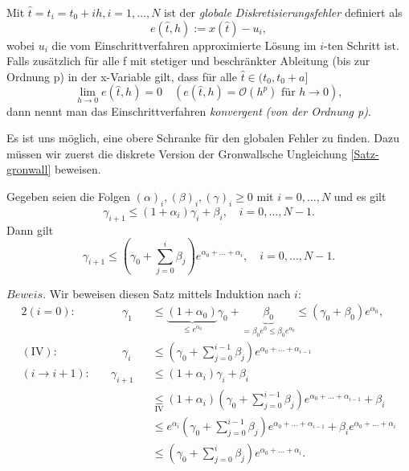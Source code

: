\begin{definition}
    Mit $\hat{t} = t_i = t_0+ih, i=1,\dots, N$ ist der {\em globale Diskretisierungsfehler} definiert als
    \[
        e(\hat{t}, h) := x(\hat{t}) - u_i,
    \]
    wobei $u_i$ die vom Einschrittverfahren approximierte Lösung im $i$-ten Schritt ist.\\
    Falls zusätzlich für alle f mit stetiger und beschränkter Ableitung (bis zur Ordnung p) in der x-Variable gilt, dass
    für alle $\hat{t} \in (t_0, t_0+a]$
    \[
        \lim_{h \rightarrow 0 } e(\hat{t}, h)=0 \quad (e(\hat{t},h) = \mathcal{O}(h^p) \text{ für } h \rightarrow 0),
    \] dann nennt man das Einschrittverfahren {\em konvergent} {\em (von der Ordnung p)}.
\end{definition}
Es ist uns möglich, eine obere Schranke für den globalen Fehler zu finden. Dazu müssen wir zuerst die diskrete Version
der Gronwallsche Ungleichung \ref{Satz-gronwall} beweisen.
\begin{satz}
    Gegeben seien die Folgen $(\alpha)_i,(\beta)_i,(\gamma)_i \geq 0$ mit $i = 0,\dots,N$ und es gilt
    \[
        \gamma_{i+1} \leq (1 + \alpha_i)\gamma_i + \beta_i, \quad i=0,\dots,N-1.
    \] Dann gilt
    \[
        \gamma_{i+1} \leq \left( \gamma_0 + \sum_{j=0}^{i}\beta_j \right) e^{\alpha_0 + \dots + \alpha_i},  \quad
        i=0, \dots, N-1.
    \]
\end{satz}
$Beweis.$ Wir beweisen diesen Satz mittels Induktion nach $i$:
\begin{alignat*}{2}
    (i=0):& \qquad \gamma_1 &&\leq
    \underbrace{(1 + \alpha_0)}_{\leq e^{\alpha_0}}\gamma_0 +
    \underbrace{\beta_0}_{=\beta_0 e^{0} \leq \beta_0 e^{\alpha_0}} \leq (\gamma_0 + \beta_0)e^{\alpha_0},\\
    (\text{IV}):& \qquad
    \gamma_{i} &&\leq \left( \gamma_0 + \sum_{j=0}^{i-1}\beta_j \right) e^{\alpha_0 + \dots + \alpha_{i-1}} \\
    (i \rightarrow i+1):& \quad
    \gamma_{i+1} &&\leq (1 + \alpha_{i})\gamma_{i} + \beta_i\\
    & &&\underset{\text{IV}}{\leq} (1 + \alpha_i)
    \left( \gamma_0 + \sum_{j=0}^{i-1}\beta_j \right) e^{\alpha_0 + \dots + \alpha_{i-1}}+\beta_{i}\\
    &  &&\leq e^{\alpha_i} \left( \gamma_0 + \sum_{j=0}^{i-1}\beta_j \right) e^{\alpha_0 + \dots + \alpha_{i-1}}
    + \beta_i e^{\alpha_0 + \dots + \alpha_{i}}\\
    &  &&\leq \left( \gamma_0 +  \sum_{j=0}^{i}\beta_j \right) e^{\alpha_0 + \dots + \alpha_{i}}.
\end{alignat*}\qedwhite\\
